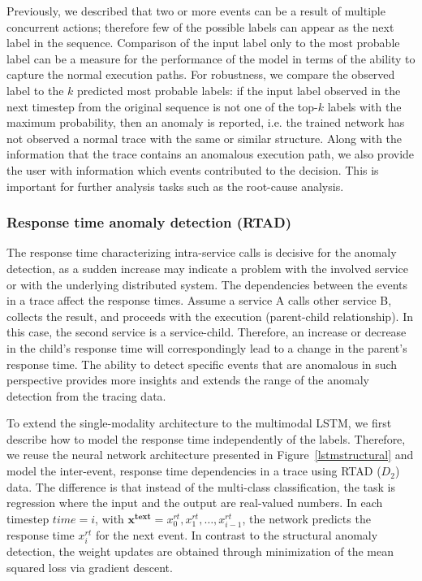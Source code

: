 Previously, we described that two or more events can be a result of multiple concurrent actions; therefore few of the possible labels can appear as the next label in the sequence. Comparison of the input label only to the most probable label can be a measure for the performance of the model in terms of the ability to capture the normal execution paths. For robustness, we compare the observed label to the $k$ predicted most probable labels: if the input label observed in the next timestep from the original sequence is not one of the top-$k$ labels with the maximum probability, then an anomaly is reported, i.e. the trained network has not observed a normal trace with the same or similar structure. Along with the information that the trace contains an anomalous execution path, we also provide the user with information which events contributed to the decision. This is important for further analysis tasks such as the root-cause analysis. 

\subsubsection{Response time anomaly detection (RTAD)}
The response time characterizing intra-service calls is decisive for the anomaly detection, as a sudden increase may indicate a problem with the involved service or with the underlying distributed system. The dependencies between the events in a trace affect the response times. Assume a service A calls other service B, collects the result, and proceeds with the execution (parent-child relationship). In this case, the second service is a service-child. Therefore, an increase or decrease in the child's response time will correspondingly lead to a change in the parent's response time. The ability to detect specific events that are anomalous in such perspective provides more insights and extends the range of the anomaly detection from the tracing data.

To extend the single-modality architecture to the multimodal LSTM, we first describe how to model the response time independently of the labels. Therefore, we reuse the neural network architecture presented in Figure~\ref{lstmstructural} and model the inter-event, response time dependencies in a trace using RTAD ($D_2$) data. The difference is that instead of the multi-class classification, the task is regression where the input and the output are real-valued numbers. In each timestep $time=i$, with $\mathbf{x^{text}}=x_0^{rt}, x_1^{rt}, \dots, x_{i-1}^{rt} $, the network predicts the response time $x_{i}^{rt}$ for the next event. In contrast to the structural anomaly detection, the weight updates are obtained through minimization of the mean squared loss via gradient descent. 

